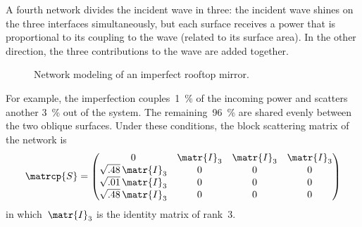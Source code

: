 \begin{refsection}
A fourth network divides the incident wave in three: the incident wave shines on the three interfaces simultaneously, but each surface receives a power that is proportional to its coupling to the wave (related to its surface area).
In the other direction, the three contributions to the wave are added together.

\begin{figure}
    \centering
    
    \caption{Network modeling of an imperfect rooftop mirror.}
    \label{fig:rooftop_networks}
\end{figure}

For example, the imperfection couples~\SI{1}{\percent} of the incoming power and scatters another \SI{3}{\percent} out of the system.
The remaining~\SI{96}{\percent} are shared evenly between the two oblique surfaces.
Under these conditions, the block scattering matrix of the network is
\begin{equation}
    \matrcp{S}
    =
    \begin{pmatrix}
        0                    & \matr{I}_3 & \matr{I}_3 & \matr{I}_3\\
        \sqrt{.48}\,\matr{I}_3 & 0 & 0 & 0\\ 
        \sqrt{.01}\,\matr{I}_3 & 0 & 0 & 0\\
        \sqrt{.48}\,\matr{I}_3 & 0 & 0 & 0
    \end{pmatrix}
\end{equation}
in which~$\matr{I}_3$ is the identity matrix of rank~3.






\end{refsection}
